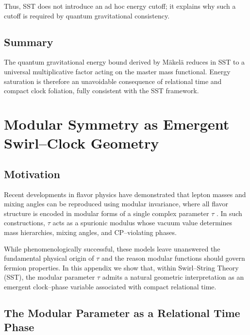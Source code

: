 \documentclass[11pt]{article}
\begin{document}
            Thus, SST does not introduce an ad hoc energy cutoff; it explains why such a
            cutoff is required by quantum gravitational consistency.

        \subsection{Summary}

            The quantum gravitational energy bound derived by M\"akel\"a reduces in SST to a
            universal multiplicative factor acting on the master mass functional.
            Energy saturation is therefore an unavoidable consequence of relational time
            and compact clock foliation, fully consistent with the SST framework.



    \section{Modular Symmetry as Emergent Swirl--Clock Geometry}
        \label{app:modular_symmetry}

        \subsection{Motivation}

            Recent developments in flavor physics have demonstrated that lepton masses and
            mixing angles can be reproduced using modular invariance, where all flavor
            structure is encoded in modular forms of a single complex parameter $\tau$
            \cite{Feruglio2018Modular,Novichkov2019Modular}.
            In such constructions, $\tau$ acts as a spurionic modulus whose vacuum value
            determines mass hierarchies, mixing angles, and CP--violating phases.

            While phenomenologically successful, these models leave unanswered the
            fundamental physical origin of $\tau$ and the reason modular functions should
            govern fermion properties.
            In this appendix we show that, within Swirl--String Theory (SST), the modular
            parameter $\tau$ admits a natural geometric interpretation as an emergent
            clock--phase variable associated with compact relational time.

        \subsection{The Modular Parameter as a Relational Time Phase}
\end{document}
